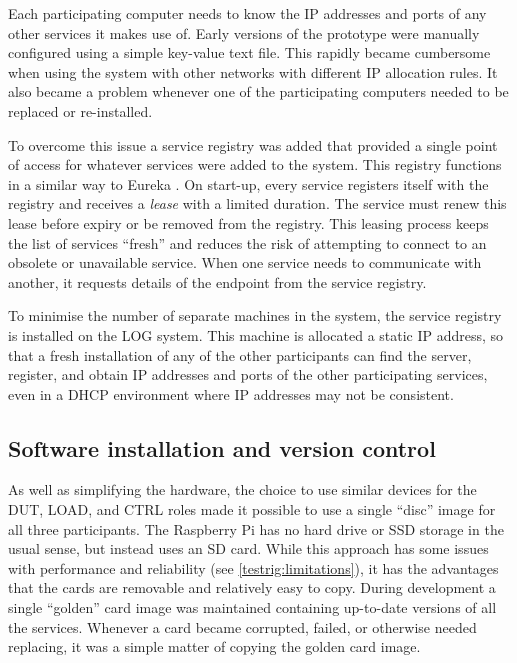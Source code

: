 Each participating computer needs to know the IP addresses and ports of any other services it makes use of. Early versions of the prototype were manually configured using a simple key-value text file. This rapidly became cumbersome when using the system with other networks with different IP allocation rules. It also became a problem whenever one of the participating computers needed to be replaced or re-installed.

To overcome this issue a service registry was added that provided a single point of access for whatever services were added to the system. This registry functions in a similar way to Eureka \citep{Netflix2012}. On start-up, every service registers itself with the registry and receives a \emph{lease} with a limited duration. The service must renew this lease before expiry or be removed from the registry. This leasing process keeps the list of services \enquote{fresh} \citep{Arnold1999} and reduces the risk of attempting to connect to an obsolete or unavailable service. When one service needs to communicate with another, it requests details of the endpoint from the service registry.

To minimise the number of separate machines in the system, the service registry is installed on the LOG system. This machine is allocated a static IP address, so that a fresh installation of any of the other participants can find the server, register, and obtain IP addresses and ports of the other participating services, even in a DHCP environment where IP addresses may not be consistent.

\subsection{Software installation and version control}

As well as simplifying the hardware, the choice to use similar devices for the DUT, LOAD, and CTRL roles made it possible to use a single \enquote{disc} image for all three participants. The Raspberry Pi has no hard drive or SSD storage in the usual sense, but instead uses an SD card. While this approach has some issues with performance and reliability (see \autoref{testrig:limitations}), it has the advantages that the cards are removable and relatively easy to copy. During development a single \enquote{golden} card image was maintained containing up-to-date versions of all the services. Whenever a card became corrupted, failed, or otherwise needed replacing, it was a simple matter of copying the golden card image.

